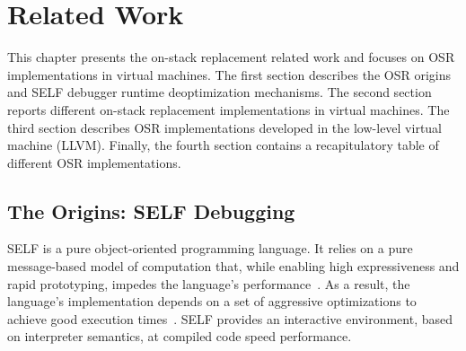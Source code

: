 
\chapter{Related Work} %

\label{Chapter3} %


\newcommand{\keyword}[1]{\textbf{#1}}
\newcommand{\tabhead}[1]{\textbf{#1}}
\newcommand{\code}[1]{\texttt{#1}}
\newcommand{\file}[1]{\texttt{\bfseries#1}}
\newcommand{\option}[1]{\texttt{\itshape#1}}

This chapter presents the on-stack replacement related work and focuses on OSR implementations in virtual machines.
The first section describes the OSR origins and SELF debugger runtime deoptimization mechanisms.
The second section reports different on-stack replacement implementations in virtual machines.
The third section describes OSR implementations developed in the low-level virtual machine (LLVM). 
Finally, the fourth section contains a recapitulatory table of different OSR implementations.

\section{The Origins: SELF Debugging}\label{SELF}
SELF is a pure object-oriented programming language.
It relies on a pure message-based model of computation that, while enabling high expressiveness and rapid prototyping, impedes the language's performance~\cite{chambers1991making, holzle1991optimizing}.
As a result, the language's implementation depends on a set of aggressive optimizations to achieve good execution times~\cite{chambers1992design, holzle1992debugging}.
SELF provides an interactive environment, based on interpreter semantics, at compiled code speed performance.\\

